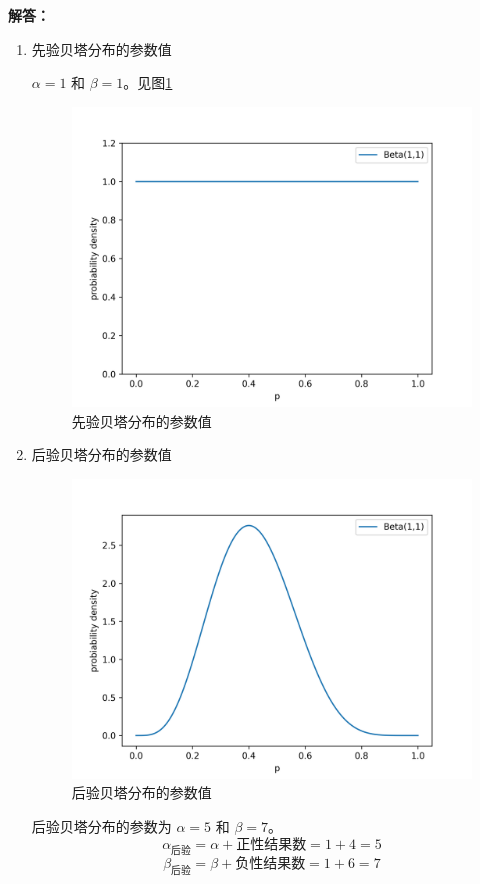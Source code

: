 \documentclass[stu,12pt,floatsintext]{apa7} %
\begin{document}
\noindent \textbf{解答：}
\begin{enumerate}[itemsep=2pt,topsep=0pt,parsep=0pt,label=(\alph*)]
    \item 先验贝塔分布的参数值
    
    \(\alpha = 1\) 和 \(\beta = 1\)。见图\ref{fig:beta11}
    \vspace{-0.4cm}
    \begin{figure}
        \centering
        \includegraphics[width=0.6\linewidth]{figure/beta11.png} %
        \caption{先验贝塔分布的参数值} %
        \label{fig:beta11} %
        \vspace{-2em}
    \end{figure}

    \item 后验贝塔分布的参数值
    

    \begin{figure}
        \vspace{-1em}
        \centering
        \includegraphics[width=0.6\linewidth]{figure/beta57.png} 
        \caption{后验贝塔分布的参数值}
        \label{fig:beta57}
        \vspace{-2em}
    \end{figure}

    后验贝塔分布的参数为 \(\alpha = 5\) 和 \(\beta = 7\)。
    \setlength\abovedisplayskip{0.7em}
    \setlength\belowdisplayskip{0.7em}
    \[
    \alpha_{\text{后验}} = \alpha + \text{正性结果数} = 1 + 4 = 5
    \]
    \[
    \beta_{\text{后验}} = \beta + \text{负性结果数} = 1 + 6 = 7
    \]



\end{enumerate}
\end{document}
